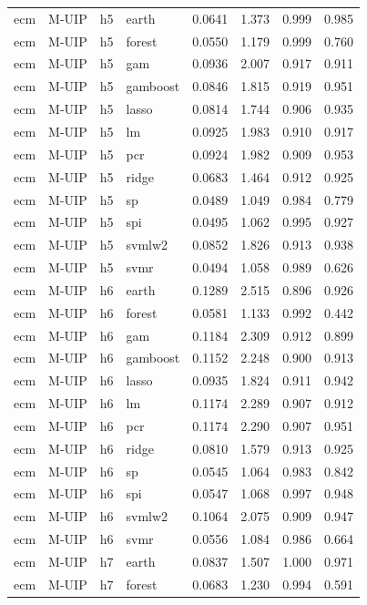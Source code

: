 \begin{ThreePartTable}
\begin{longtable}[t]{llclcccc}
\addlinespace
ecm & M-UIP & h5 & earth & 0.0641 & 1.373 & 0.999 & 0.985\\
ecm & M-UIP & h5 & forest & 0.0550 & 1.179 & 0.999 & 0.760\\
ecm & M-UIP & h5 & gam & 0.0936 & 2.007 & 0.917 & 0.911\\
ecm & M-UIP & h5 & gamboost & 0.0846 & 1.815 & 0.919 & 0.951\\
ecm & M-UIP & h5 & lasso & 0.0814 & 1.744 & 0.906 & 0.935\\
ecm & M-UIP & h5 & lm & 0.0925 & 1.983 & 0.910 & 0.917\\
ecm & M-UIP & h5 & pcr & 0.0924 & 1.982 & 0.909 & 0.953\\
ecm & M-UIP & h5 & ridge & 0.0683 & 1.464 & 0.912 & 0.925\\
ecm & M-UIP & h5 & sp & 0.0489 & 1.049 & 0.984 & 0.779\\
ecm & M-UIP & h5 & spi & 0.0495 & 1.062 & 0.995 & 0.927\\
ecm & M-UIP & h5 & svmlw2 & 0.0852 & 1.826 & 0.913 & 0.938\\
ecm & M-UIP & h5 & svmr & 0.0494 & 1.058 & 0.989 & 0.626\\
\addlinespace
ecm & M-UIP & h6 & earth & 0.1289 & 2.515 & 0.896 & 0.926\\
ecm & M-UIP & h6 & forest & 0.0581 & 1.133 & 0.992 & 0.442\\
ecm & M-UIP & h6 & gam & 0.1184 & 2.309 & 0.912 & 0.899\\
ecm & M-UIP & h6 & gamboost & 0.1152 & 2.248 & 0.900 & 0.913\\
ecm & M-UIP & h6 & lasso & 0.0935 & 1.824 & 0.911 & 0.942\\
ecm & M-UIP & h6 & lm & 0.1174 & 2.289 & 0.907 & 0.912\\
ecm & M-UIP & h6 & pcr & 0.1174 & 2.290 & 0.907 & 0.951\\
ecm & M-UIP & h6 & ridge & 0.0810 & 1.579 & 0.913 & 0.925\\
ecm & M-UIP & h6 & sp & 0.0545 & 1.064 & 0.983 & 0.842\\
ecm & M-UIP & h6 & spi & 0.0547 & 1.068 & 0.997 & 0.948\\
ecm & M-UIP & h6 & svmlw2 & 0.1064 & 2.075 & 0.909 & 0.947\\
ecm & M-UIP & h6 & svmr & 0.0556 & 1.084 & 0.986 & 0.664\\
\addlinespace
ecm & M-UIP & h7 & earth & 0.0837 & 1.507 & 1.000 & 0.971\\
ecm & M-UIP & h7 & forest & 0.0683 & 1.230 & 0.994 & 0.591\\

\end{longtable}
\end{ThreePartTable}
